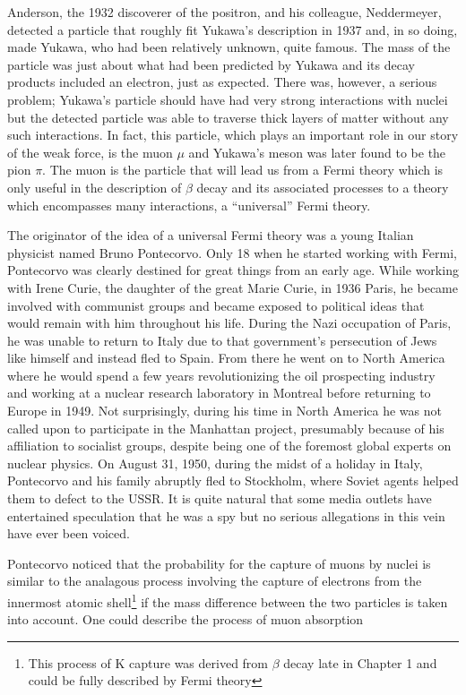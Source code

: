 \documentclass[12pt]{book}
\begin{document}
Anderson, the 1932 discoverer of the positron, and his colleague, Neddermeyer, detected a particle that roughly fit Yukawa's description in 1937 \cite{anderson:muon} and, in so doing, made Yukawa, who had been relatively unknown, quite famous. The mass of the particle was just about what had been predicted by Yukawa and its decay products included an electron, just as expected. There was, however, a serious problem; Yukawa's particle should have had very strong interactions with nuclei but the detected particle was able to traverse thick layers of matter without any such interactions. In fact, this particle, which plays an important role in our story of the weak force, is the muon $\mu$ and Yukawa's meson was later found to be the pion $\pi$. The muon is the particle that will lead us from a Fermi theory which is only useful in the description of $\beta$ decay and its associated processes to a theory which encompasses many interactions, a ``universal'' Fermi theory. 

The originator of the idea of a universal Fermi theory was a young Italian physicist named Bruno Pontecorvo. Only 18 when he started working with Fermi, Pontecorvo was clearly destined for great things from an early age. While working with Irene Curie, the daughter of the great Marie Curie, in 1936 Paris, he became involved with communist groups and became exposed to political ideas that would remain with him throughout his life. During the Nazi occupation of Paris, he was unable to return to Italy due to that government's persecution of Jews like himself and instead fled to Spain. From there he went on to North America where he would spend a few years revolutionizing the oil prospecting industry and working at a nuclear research laboratory in Montreal before returning to Europe in 1949. Not surprisingly, during his time in North America he was not called upon to participate in the Manhattan project, presumably because of his affiliation to socialist groups, despite being one of the foremost global experts on nuclear physics. On August 31, 1950, during the midst of a holiday in Italy, Pontecorvo and his family abruptly fled to Stockholm, where Soviet agents helped them to defect to the USSR. It is quite natural that some media outlets have entertained speculation that he was a spy but no serious allegations in this vein have ever been voiced.

Pontecorvo noticed that the probability for the capture of muons by nuclei is similar to the analagous process involving the capture of electrons from the innermost atomic shell\footnote{This process of K capture was derived from $\beta$ decay late in Chapter 1 and could be fully described by Fermi theory} if the mass difference between the two particles is taken into account. One could describe the process of muon absorption
\end{document}
